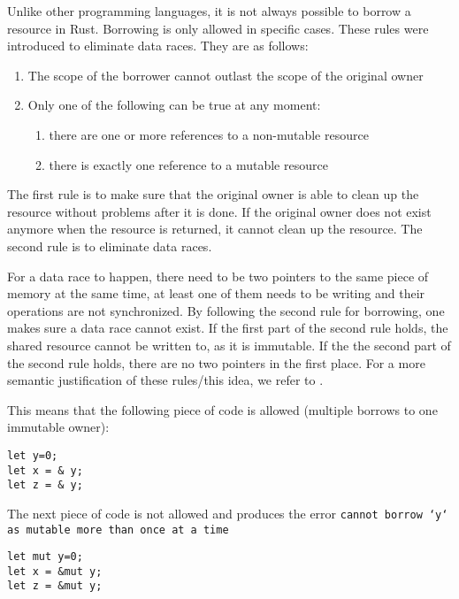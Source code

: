 Unlike other programming languages, it is not always possible to borrow a resource in Rust. Borrowing is only allowed in specific cases. These rules were introduced to eliminate data races. They are as follows:
\begin{enumerate}[noitemsep]
    \item The scope of the borrower cannot outlast the scope of the original owner
\item Only one of the following can be true at any moment:
    \begin{enumerate}[noitemsep]
        \item there are one or more references to a non-mutable resource
        \item there is exactly one reference to a mutable resource
    \end{enumerate}
\end{enumerate}

The first rule is to make sure that the original owner is able to clean up the resource without problems after it is done. If the original owner does not exist anymore when the resource is returned, it cannot clean up the resource. The second rule is to eliminate data races. 

For a data race to happen, there need to be two pointers to the same piece of memory at the same time, at least one of them needs to be writing and their operations are not synchronized. By following the second rule for borrowing, one makes sure a data race cannot exist. If the first part of the second rule holds, the shared resource cannot be written to, as it is immutable. If the the second part of the second rule holds, there are no two pointers in the first place. For a more semantic justification of these rules/this idea, we refer to \cite{boyland2003checking}.

This means that the following piece of code is allowed (multiple borrows to one immutable owner):

\begin{verbatim}
let y=0;
let x = & y; 
let z = & y;
\end{verbatim}

The next piece of code is not allowed and produces the error \texttt{cannot borrow `y` as mutable more than once at a time}

\begin{verbatim}
let mut y=0;
let x = &mut y; 
let z = &mut y;
\end{verbatim}

